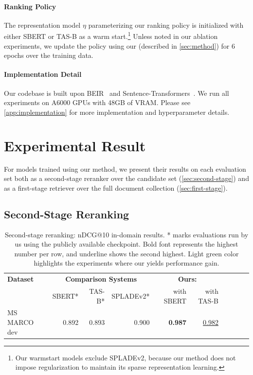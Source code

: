 \documentclass{article}
\begin{document}
\paragraph{Ranking Policy} 
The representation model $\eta$ parameterizing our ranking policy is initialized with either SBERT or TAS-B as a warm start.\footnote{Our warmstart models exclude SPLADEv2, because our \alg{} method does not impose regularization to maintain its sparse representation learning.} Unless noted in our ablation experiments, we update the policy using our \alg{} (described in \autoref{sec:method}) for 6 epochs over the training data.




\paragraph{Implementation Detail} Our codebase is built upon BEIR~\citep{Thakur2021BEIRAH} and Sentence-Transformers~\citep{reimers-2019-sentence-bert}. 
We run all experiments on A6000 GPUs with 48GB of VRAM. Please see \autoref{app:implementation} for more implementation and hyperparameter details. %


\section{Experimental Result}
For models trained using our method, we present their results on each evaluation set both as a second-stage reranker over the candidate set (\autoref{sec:second-stage}) and as a first-stage retriever over the full document collection (\autoref{sec:first-stage}). 






\subsection{Second-Stage Reranking} 
\label{sec:second-stage}

\begin{table}[tb!] 
    \vspace{-20pt}
    \caption{Second-stage reranking: nDCG@10 in-domain results. * marks evaluations run by us using the publicly available checkpoint. Bold font represents the highest number per row, and underline shows the second highest. Light green color highlights the experiments where our \alg{} yields performance gain.} 
    \vspace{5pt}
    \centering \small
    \begin{tabular}{l r r r r r r r r r }
        \toprule
        \textbf{Dataset} & \multicolumn{3}{c}{\textbf{Comparison Systems}} & \multicolumn{2}{c}{\textbf{Ours: \alg{}}} \\
            & SBERT* & TAS-B* & SPLADEv2* & with SBERT & with TAS-B   \\ 
        \midrule
MS MARCO dev & 0.892 & 0.893 & 0.900 & \cellcolor{lightgreen}\textbf{0.987} & \cellcolor{lightgreen}\underline{0.982} \\
        \bottomrule
    \end{tabular}
    \vspace{-10pt}
    \label{tab:eval_rerank_in-domain}
\end{table}
\end{document}
